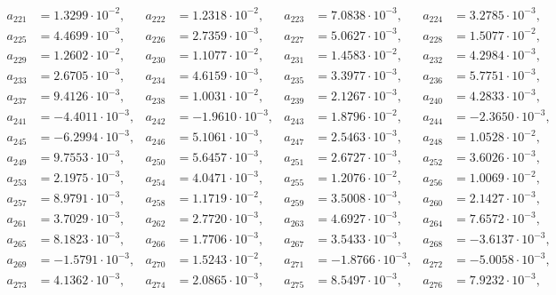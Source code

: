 \begin{align*}
a_{ 221 } &= 1.3299 \cdot 10^{ -2 }, & a_{ 222 } &= 1.2318 \cdot 10^{ -2 }, & a_{ 223 } &= 7.0838 \cdot 10^{ -3 }, & a_{ 224 } &= 3.2785 \cdot 10^{ -3 },\\ 
a_{ 225 } &= 4.4699 \cdot 10^{ -3 }, & a_{ 226 } &= 2.7359 \cdot 10^{ -3 }, & a_{ 227 } &= 5.0627 \cdot 10^{ -3 }, & a_{ 228 } &= 1.5077 \cdot 10^{ -2 },\\ 
a_{ 229 } &= 1.2602 \cdot 10^{ -2 }, & a_{ 230 } &= 1.1077 \cdot 10^{ -2 }, & a_{ 231 } &= 1.4583 \cdot 10^{ -2 }, & a_{ 232 } &= 4.2984 \cdot 10^{ -3 },\\ 
a_{ 233 } &= 2.6705 \cdot 10^{ -3 }, & a_{ 234 } &= 4.6159 \cdot 10^{ -3 }, & a_{ 235 } &= 3.3977 \cdot 10^{ -3 }, & a_{ 236 } &= 5.7751 \cdot 10^{ -3 },\\ 
a_{ 237 } &= 9.4126 \cdot 10^{ -3 }, & a_{ 238 } &= 1.0031 \cdot 10^{ -2 }, & a_{ 239 } &= 2.1267 \cdot 10^{ -3 }, & a_{ 240 } &= 4.2833 \cdot 10^{ -3 },\\ 
a_{ 241 } &= -4.4011 \cdot 10^{ -3 }, & a_{ 242 } &= -1.9610 \cdot 10^{ -3 }, & a_{ 243 } &= 1.8796 \cdot 10^{ -2 }, & a_{ 244 } &= -2.3650 \cdot 10^{ -3 },\\ 
a_{ 245 } &= -6.2994 \cdot 10^{ -3 }, & a_{ 246 } &= 5.1061 \cdot 10^{ -3 }, & a_{ 247 } &= 2.5463 \cdot 10^{ -3 }, & a_{ 248 } &= 1.0528 \cdot 10^{ -2 },\\ 
a_{ 249 } &= 9.7553 \cdot 10^{ -3 }, & a_{ 250 } &= 5.6457 \cdot 10^{ -3 }, & a_{ 251 } &= 2.6727 \cdot 10^{ -3 }, & a_{ 252 } &= 3.6026 \cdot 10^{ -3 },\\ 
a_{ 253 } &= 2.1975 \cdot 10^{ -3 }, & a_{ 254 } &= 4.0471 \cdot 10^{ -3 }, & a_{ 255 } &= 1.2076 \cdot 10^{ -2 }, & a_{ 256 } &= 1.0069 \cdot 10^{ -2 },\\ 
a_{ 257 } &= 8.9791 \cdot 10^{ -3 }, & a_{ 258 } &= 1.1719 \cdot 10^{ -2 }, & a_{ 259 } &= 3.5008 \cdot 10^{ -3 }, & a_{ 260 } &= 2.1427 \cdot 10^{ -3 },\\ 
a_{ 261 } &= 3.7029 \cdot 10^{ -3 }, & a_{ 262 } &= 2.7720 \cdot 10^{ -3 }, & a_{ 263 } &= 4.6927 \cdot 10^{ -3 }, & a_{ 264 } &= 7.6572 \cdot 10^{ -3 },\\ 
a_{ 265 } &= 8.1823 \cdot 10^{ -3 }, & a_{ 266 } &= 1.7706 \cdot 10^{ -3 }, & a_{ 267 } &= 3.5433 \cdot 10^{ -3 }, & a_{ 268 } &= -3.6137 \cdot 10^{ -3 },\\ 
a_{ 269 } &= -1.5791 \cdot 10^{ -3 }, & a_{ 270 } &= 1.5243 \cdot 10^{ -2 }, & a_{ 271 } &= -1.8766 \cdot 10^{ -3 }, & a_{ 272 } &= -5.0058 \cdot 10^{ -3 },\\ 
a_{ 273 } &= 4.1362 \cdot 10^{ -3 }, & a_{ 274 } &= 2.0865 \cdot 10^{ -3 }, & a_{ 275 } &= 8.5497 \cdot 10^{ -3 }, & a_{ 276 } &= 7.9232 \cdot 10^{ -3 },\\ 

\end{align*}
